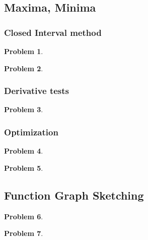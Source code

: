 \documentclass{article}
\newtheorem{problem}{Problem}
\begin{document}
\subsection{Maxima, Minima}\label{secMPSoneVariableMinMax}
\subsubsection{Closed Interval method}\label{secMPSclosedInterval}
\begin{problem}

\end{problem}


\begin{problem}

\end{problem}

\subsubsection{Derivative tests}
\begin{problem}

\end{problem}


\subsubsection{Optimization}\label{secMPSoptimization}
\begin{problem}

\end{problem}
\begin{problem}

\end{problem}


\subsection{Function Graph Sketching}\label{secMPSfunctionGraphSketching}
\begin{problem}

\end{problem}


\begin{problem}

\end{problem}
\end{document}

